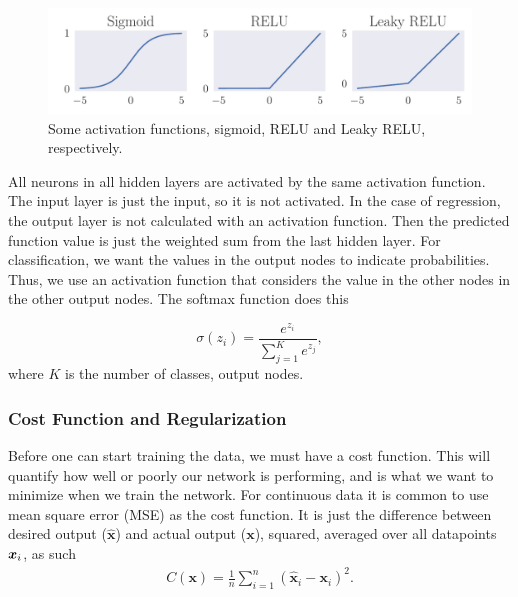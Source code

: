 \documentclass[12pt]{extarticle}
\begin{document}
\begin{figure}[h]
	\includegraphics[width=\linewidth]{pictures/activation_functions.pdf}
	\caption{Some activation functions, sigmoid, RELU and Leaky RELU, respectively.}\label{fig:activation_functions}
\end{figure}

All neurons in all hidden layers are activated by the same activation function. The input layer is just the input, so it is not activated. In the case of regression, the output layer is not calculated with an activation function. Then the predicted function value is just the weighted sum from the last hidden layer. For classification, we want the values in the output nodes to indicate probabilities. Thus, we use an activation function that considers the value in the other nodes in the other output nodes. The softmax function does this

\begin{equation} \label{eq:softmax}
	\sigma(z_i) = \frac{e^{z_i}}{\sum_{j=1}^Ke^{z_j}},
\end{equation}
where $K$ is the number of classes, output nodes.

\subsubsection{Cost Function and Regularization}\label{sec:cost_func_and_regul}
Before one can start training the data, we must have a cost function. This will quantify how well or poorly our network is performing, and is what we want to minimize when we train the network. For continuous data it is common to use mean square error (MSE) as the cost function. It is just the difference between desired output ($\hat{\mathbf{x}}$) and actual output ($\mathbf{x}$), squared, averaged over all datapoints $\boldsymbol x_i$, as such
\begin{align}
	C(\mathbf{x}) = \frac{1}{n}\sum_{i=1}^{n}(\hat{\mathbf{x}}_i - \mathbf{x}_i)^2.
	\label{eq:MSE}
\end{align}
\end{document}
